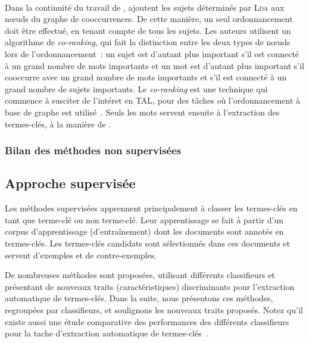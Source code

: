        ~\\Dans la continuité du travail de ,
         ajoutent les sujets déterminés par
        \textsc{Lda} aux n\oe{}uds du graphe de cooccurrences. De cette manière,
        un seul ordonnancement doit être effectué, en tenant compte de tous les
        sujets. Les auteurs utilisent un algorithme de \textit{co-ranking}, qui
        fait la distinction entre les deux types de n\oe{}uds lors de
        l'ordonnancement~: un sujet est d'autant plus important s'il est
        connecté à un grand nombre de mots importants et un mot est d'autant
        plus important s'il cooccurre avec un grand nombre de mots importants et
        s'il est connecté à un grand nombre de sujets importants. Le
        \textit{co-ranking} est une technique qui commence à susciter de
        l'intéret en \textsc{TAL}, pour des tâches où l'ordonnancement à base de
        graphe est
        utilisé~\cite{wan2011corankingsummarization,yan2012corankingtweetrecommendation,liu2014corankingopinionmining}.
        Seuls les mots servent ensuite à l'extraction des termes-clés, à la
        manière de .

      \subsubsection{Bilan des méthodes non supervisées}
      \label{subsubsec:main-state_of_the_art-automatic_keyphrase_extraction-unsupervised_keyphrase_extraction-bilan}
        \TODO{\dots}

    \subsection{Approche supervisée}
    \label{subsec:main-state_of_the_art-automatic_keyphrase_extraction-supervised_keyphrase_extraction}
      Les méthodes supervisées apprennent principalement à classer les
      termes-clés en tant que \og{}terme-clé\fg{} ou \og{}non terme-clé\fg{}.
      Leur apprentissage se fait à partir d'un corpus d'apprentissage
      (d'entraînement) dont les documents sont annotés en termes-clés. Les
      termes-clés candidats sont sélectionnés dans ces documents et servent
      d'exemples et de contre-exemples.

      De nombreuses méthodes sont proposées, utilisant différents classifieurs
      et présentant de nouveaux traits (caractéristiques) discriminants pour
      l'extraction automatique de termes-clés. Dans la suite, nous présentons
      ces méthodes, regroupées par classifieurs, et soulignons les nouveaux
      traits proposés. Notez qu'il existe aussi une étude comparative des
      performances des différents classifieurs pour la tache d'extraction
      automatique de termes-clés~\cite{sarkar2012machinelearningcomparison}.

